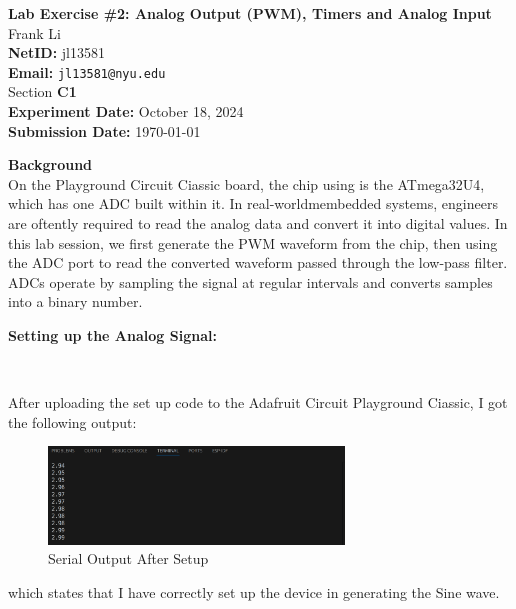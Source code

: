 \documentclass{report}
\begin{document}
    \begin{titlepage}
        \vspace*{\fill}
        \begin{center}
            \textbf{\huge Lab Exercise \#2: Analog Output (PWM), Timers and Analog Input} \\[1em]
            Frank Li \\
            \textbf{NetID:} jl13581\\
            \textbf{Email:} \texttt{jl13581@nyu.edu}\\
            Section \textbf{C1} \\ [1em]
            \textbf{Experiment Date:} October 18, 2024\\
            \textbf{Submission Date:} \today
        \end{center}
        \vspace*{\fill}
    \end{titlepage}
	\pagestyle{fancy}
	\fancyhf{}
	\fancyfoot[R]{\thepage}

    {\Large \textbf{Background}}\\[0.5em]
    On the Playground Circuit Ciassic board, the chip using is the ATmega32U4, which has one ADC built within it. In real-worldmembedded systems, engineers are oftently required to read the analog data and convert it into digital values. In this lab session, we first generate the PWM waveform from the chip, then using the ADC port to read the converted waveform passed through the low-pass filter. ADCs operate by sampling the  signal at regular intervals and converts samples into a binary number.\\

    \begin{minipage}{\textwidth}
        \Large
        \textbf{Setting up the Analog Signal:}
    \end{minipage}\\[0.5em]
    \begin{minipage}{\textwidth}
        After uploading the set up code to the Adafruit Circuit Playground Ciassic, I got the following output:
    \end{minipage}
    \begin{figure}[H]
        \centering
        \includegraphics[width = 0.7\textwidth]{setup.png}
        \caption{Serial Output After Setup}
    \end{figure}
    \begin{minipage}{\textwidth}
        which states that I have correctly set up the device in generating the Sine wave. 
    \end{minipage}\\
\end{document}
